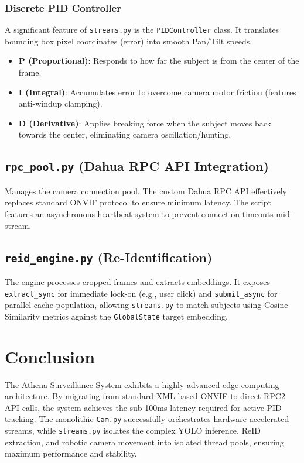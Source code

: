\documentclass[12pt,a4paper]{article}
\begin{document}
\subsubsection{Discrete PID Controller}
A significant feature of \texttt{streams.py} is the \texttt{PIDController} class. It translates bounding box pixel coordinates (error) into smooth Pan/Tilt speeds.
\begin{itemize}
    \item \textbf{P (Proportional)}: Responds to how far the subject is from the center of the frame.
    \item \textbf{I (Integral)}: Accumulates error to overcome camera motor friction (features anti-windup clamping).
    \item \textbf{D (Derivative)}: Applies breaking force when the subject moves back towards the center, eliminating camera oscillation/hunting.
\end{itemize}

\subsection{\texttt{rpc\_pool.py} (Dahua RPC API Integration)}
Manages the camera connection pool. The custom Dahua RPC API effectively replaces standard ONVIF protocol to ensure minimum latency. The script features an asynchronous heartbeat system to prevent connection timeouts mid-stream.

\subsection{\texttt{reid\_engine.py} (Re-Identification)}
The engine processes cropped frames and extracts embeddings. It exposes \texttt{extract\_sync} for immediate lock-on (e.g., user click) and \texttt{submit\_async} for parallel cache population, allowing \texttt{streams.py} to match subjects using Cosine Similarity metrics against the \texttt{GlobalState} target embedding.

\section{Conclusion}
The Athena Surveillance System exhibits a highly advanced edge-computing architecture. By migrating from standard XML-based ONVIF to direct RPC2 API calls, the system achieves the sub-100ms latency required for active PID tracking. The monolithic \texttt{Cam.py} successfully orchestrates hardware-accelerated streams, while \texttt{streams.py} isolates the complex YOLO inference, ReID extraction, and robotic camera movement into isolated thread pools, ensuring maximum performance and stability.
\end{document}
